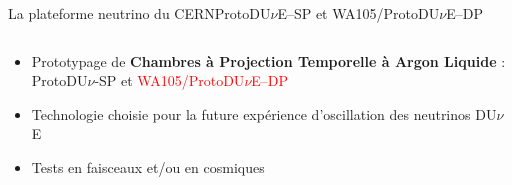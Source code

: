 \begin{frame}{La plateforme neutrino du CERN}{ProtoDU$\nu$E--SP et WA105/ProtoDU$\nu$E--DP}
\begin{columns}
\begin{column}{0.5\textwidth}
\begin{scriptsize}
                    \begin{itemize}
                        \item Prototypage de \textbf{Chambres à Projection Temporelle à Argon Liquide} : ProtoDU$\nu$-SP et \textcolor{red}{WA105/ProtoDU$\nu$E--DP}
                        \item Technologie choisie pour la future expérience d'oscillation des neutrinos DU$\nu$E
                        \item Tests en faisceaux et/ou en cosmiques
                    \end{itemize}
                \end{scriptsize}
            \end{column}
        \end{columns}
    \end{frame}
        
